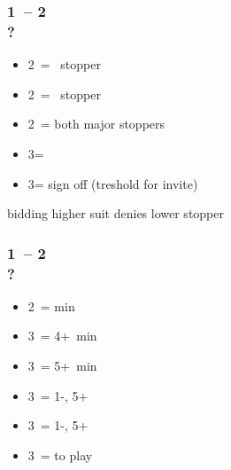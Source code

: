 \documentclass[12pt, a4paper]{article}
\begin{document}
\subsubsection*{1\diams\ -- 2\diams \\ ?}
\begin{itemize}
    \item 2\hearts\ = \hearts\ stopper
    \item 2\spades\ = \spades\ stopper
    \item 2\nt\ = both major stoppers
    \item 3\clubs = \nat
    \item 3\diams = sign off (treshold for invite)
\end{itemize}

bidding higher suit denies lower stopper

\subsubsection*{1\diams\ -- 2\spades \\ ?}
\begin{itemize}
    \item 2\nt\ = \bal min
    \item 3\clubs\ = 4+\clubs\ min
    \item 3\diams\ = 5+\diams\ min
    \item 3\hearts\ = 1-\hearts, 5+\diams\ \gf
    \item 3\spades\ = 1-\spades, 5+\diams\ \gf
    \item 3\nt\ = to play
\end{itemize}

\end{document}

